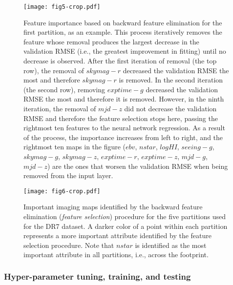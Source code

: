 \documentclass[fleqn, usenatbib]{mnras}
\begin{document}
\begin{figure}
    \centering
    \texttt{[image: fig5-crop.pdf]}
    \caption{Feature importance based on backward feature elimination for the first partition, as an example. This process iteratively removes the feature whose removal produces the largest decrease in the validation RMSE (i.e., the greatest improvement in fitting) until no decrease is observed. After the first iteration of removal (the top row), the removal of $skymag-r$ decreased the validation RMSE the most and therefore $skymag-r$ is removed. In the second iteration (the second row), removing $exptime-g$ decreased the validation RMSE the most and therefore it is removed. However, in the ninth iteration, the removal of $mjd-z$ did not decrease the validation RMSE and therefore the feature selection stops here, passing the rightmost ten features to the neural network regression. As a result of the process, the importance increases from left to right, and the rightmost ten maps in the figure ($ebv$, $nstar$, $logHI$, $seeing-g$, $skymag-g$, $skymag-z$, $exptime-r$, $exptime-z$, $mjd-g$, $mjd-z$) are the ones that worsen the validation RMSE when being removed from the input layer.}
    \label{fig:dr7ablation}
\end{figure}

\begin{figure}
    \centering
    \texttt{[image: fig6-crop.pdf]}
    \caption{Important imaging maps identified by the backward feature elimination (\textit{feature selection}) procedure for the five partitions used for the DR7 dataset. A darker color of a point within each partition represents a more important attribute identified by the feature selection procedure. Note that $nstar$ is identified as the most important attribute in all partitions, i.e., across the footprint.}
    \label{fig:dr7ablation2}
\end{figure}
 

\subsubsection{Hyper-parameter tuning, training, and testing}
\end{document}
